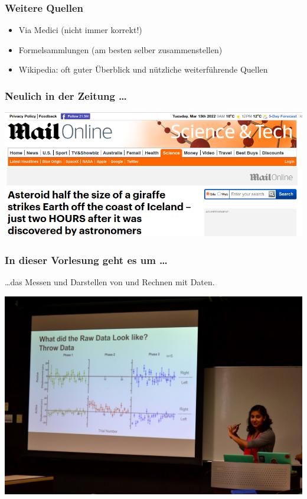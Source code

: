\documentclass{beamer}
\begin{document}
 \begin{frame}
\frametitle{Weitere Quellen}

\begin{itemize}
\item 
Via Medici (nicht immer korrekt!)
\item
Formelsammlungen (am besten selber zusammenstellen)
\item 
Wikipedia: oft guter Überblick und nützliche weiterführende Quellen

\end{itemize}


\end{frame}

\begin{frame}
\frametitle{Neulich in der Zeitung \dots}

\begin{center}
\includegraphics[width=\textwidth]{giraffe.png}
\end{center}

 
\end{frame}

\begin{frame}
\frametitle{In dieser Vorlesung geht es um \dots}

\dots das \textcolor{theme}{Messen} und \textcolor{theme}{Darstellen} von und \textcolor{theme}{Rechnen} mit Daten.

\begin{center}
\includegraphics[width=\textwidth]{student_presenting.jpg}

\end{center}

 
\end{frame}
\end{document}
